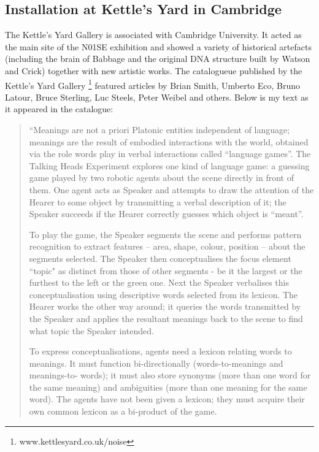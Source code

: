 \subsection{Installation at Kettle's Yard in Cambridge} 

The Kettle's Yard Gallery is associated with Cambridge University. It acted as the main site of the N01SE exhibition 
and showed a variety of historical artefacts (including the brain of Babbage and the original DNA structure built by 
Watson and Crick) together with new artistic works. The catalogueue published by the Kettle's Yard 
Gallery \footnote{www.kettlesyard.co.uk/noise} featured articles by Brian Smith, Umberto Eco, Bruno Latour, 
Bruce Sterling, Luc Steels, Peter Weibel and others. Below is my text as it appeared in the catalogue: 
\begin{quotation}
``Meanings are not a priori Platonic entities independent of language; meanings are the result of embodied interactions with the world, obtained via the role words play in verbal interactions called ``language games''. The Talking Heads Experiment explores one kind of language game: a guessing game played by two robotic agents about the scene directly in front of them. One agent acts as Speaker and attempts to draw the attention of the Hearer to some object by transmitting a verbal description of it; the Speaker succeeds if the Hearer correctly guesses which object is ``meant''.

To play the game, the Speaker segments the scene and performs pattern recognition to extract features -- area, shape, colour, position -- about the segments selected. The Speaker then conceptualises the focus element ``topic" as distinct from those of other segments - be it the largest or the furthest to the left or the green one. Next the Speaker verbalises this conceptualisation using descriptive words selected from its lexicon. The Hearer works the other way around; it queries the words transmitted by the Speaker and applies the resultant meanings back to the scene to find what topic the Speaker intended.

To express conceptualisations, agents need a lexicon relating words to meanings. It must function 
bi-directionally (words-to-meanings and meanings-to- words); it must also store synonyms (more than one word for the same meaning) and ambiguities (more than one meaning for the same word). The agents have not been given a lexicon; they must acquire their own common lexicon as a bi-product of the game.


\end{quotation}

